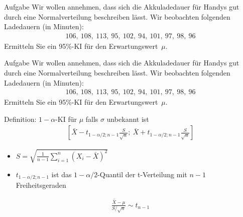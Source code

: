 \documentclass[t,11pt]{beamer}
\begin{document}
	\subtitle{}
	\logo{}
	\institute{}
	\date{}
	\subject{}

\addtocounter{framenumber}{-1}

\begin{frame}
\begin{block}{Aufgabe}
	Wir wollen annehmen, dass sich die Akkuladedauer für Handys gut durch eine Normalverteilung beschreiben lässt. Wir beobachten folgenden Ladedauern (in Minuten):
	\begin{align*}
		106,~108,~113,~95,~102,~94,~101,~97,~98,~96 
	\end{align*}
	Ermitteln Sie ein 95\%-KI für den Erwartungswert~$\mu$.
\end{block}
\end{frame}

\begin{frame}
\begin{block}{Aufgabe}
	Wir wollen annehmen, dass sich die Akkuladedauer für Handys gut durch eine Normalverteilung beschreiben lässt. Wir beobachten folgenden Ladedauern (in Minuten):
	\begin{align*}
	106,~108,~113,~95,~102,~94,~101,~97,~98,~96 
	\end{align*}
	Ermitteln Sie ein 95\%-KI für den Erwartungswert~$\mu$.
\end{block}
\begin{alertblock}{Definition: $1-\alpha$-KI für $\mu$ falls $\sigma$ unbekannt ist}
	\begin{align*}
	\left[ \bar{X} - t_{1-\alpha/2; n-1} \frac{S}{\sqrt{n}};~\bar{X} + t_{1-\alpha/2; n-1} \frac{S}{\sqrt{n}} \right]
	\end{align*}
	\vspace{-0.5cm}
	\begin{itemize}
		\item $S=\sqrt{\frac{1}{n-1}\sum_{i=1}^{n}(X_i-\bar{X})^2}$
		\item $t_{1-\alpha/2; n-1}$ ist das $1-\alpha/2$-Quantil der t-Verteilung mit $n-1$ Freiheitsgeraden
	\end{itemize}
\end{alertblock}
\end{frame}

\begin{frame}
\begin{align*}
\frac{\bar{X}-\mu}{S/\sqrt{n}}\sim t_{n-1}
\end{align*}
\end{frame}
\end{document}

